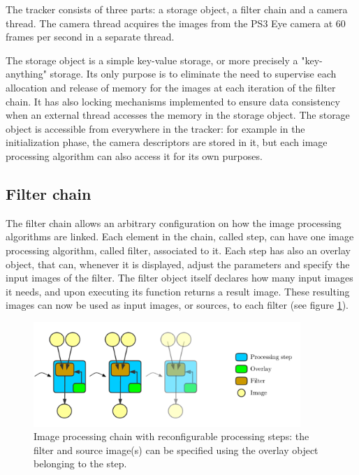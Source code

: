 The tracker consists of three parts: a storage object, a filter chain and a camera thread. The camera thread acquires the images from the PS3 Eye camera at 60 frames per second in a separate thread. 

The storage object is a simple key-value storage, or more precisely a "key-anything" storage. Its only purpose is to eliminate the need to supervise each allocation and release of memory for the images at each iteration of the filter chain. It has also locking mechanisms implemented to ensure data consistency when an external thread accesses the memory in the storage object. The storage object is accessible from everywhere in the tracker: for example in the initialization phase, the camera descriptors are stored in it, but each image processing algorithm can also access it for its own purposes.

\subsection{Filter chain}
\label{sub:filter-chain}

The filter chain allows an arbitrary configuration on how the image processing algorithms are linked. Each element in the chain, called step, can have one image processing algorithm, called filter, associated to it.
Each step has also an overlay object, that can, whenever it is displayed, adjust the parameters and specify the input images of the filter. The filter object itself declares how many input images it needs, and upon executing its function returns a result image. These resulting images can now be used as input images, or sources, to each filter (see figure \ref{fig:chain-general}).

\begin{figure}[H]
\center
\includegraphics[width=0.9\textwidth]{images/steps} 
\caption{Image processing chain with reconfigurable processing steps: the filter and source image(s) can be specified using the overlay object belonging to the step. }
\label{fig:chain-general}
\end{figure}

